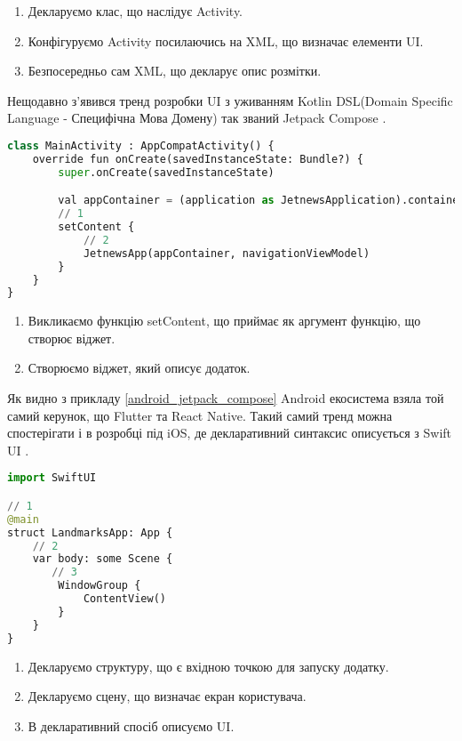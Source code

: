 \begin{enumerate}
    \item Декларуємо клас, що наслідує Activity.
    \item Конфігуруємо Activity посилаючись на XML, що визначає елементи UI.
    \item Безпосередньо сам XML, що декларує опис розмітки.
\end{enumerate}

Нещодавно з'явився тренд розробки UI з уживанням
Kotlin DSL(Domain Specific Language - Специфічна Мова Домену) так званий Jetpack Compose \cite{jetpack_compose}.

\begin{lstlisting}[style=light, language=Python,label={lst:android_jetpack_compose},caption=Android Jetpack Compose]
class MainActivity : AppCompatActivity() {
    override fun onCreate(savedInstanceState: Bundle?) {
        super.onCreate(savedInstanceState)

        val appContainer = (application as JetnewsApplication).container
        // 1
        setContent {
            // 2
            JetnewsApp(appContainer, navigationViewModel)
        }
    }
}
\end{lstlisting}

\begin{enumerate}
    \item Викликаємо функцію setContent, що приймає як аргумент функцію, що створює віджет.
    \item Створюємо віджет, який описує додаток.
\end{enumerate}

Як видно з прикладу \ref{android_jetpack_compose} Android екосистема взяла той самий керунок, що Flutter та React Native.
Такий самий тренд можна спостерігати і в розробці під iOS, де декларативний синтаксис описується з Swift UI \cite{swift_ui}.

\begin{lstlisting}[style=light, language=Python,label={lst:ios_swift_ui},caption=Swift UI]
import SwiftUI

// 1
@main
struct LandmarksApp: App {
    // 2
    var body: some Scene {
       // 3
        WindowGroup {
            ContentView()
        }
    }
}
\end{lstlisting}

\begin{enumerate}
    \item Декларуємо структуру, що є вхідною точкою для запуску додатку.
    \item Декларуємо сцену, що визначає екран користувача.
    \item В декларативний спосіб описуємо UI.
\end{enumerate}

